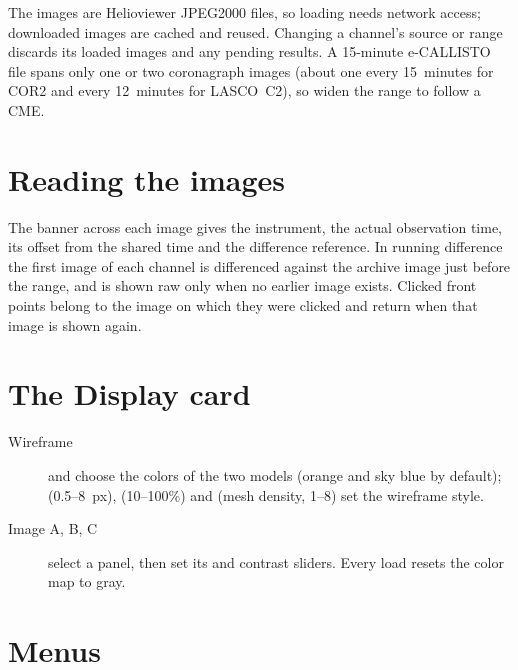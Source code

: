 The images are Helioviewer JPEG2000 files, so loading needs network access; downloaded images
are cached and reused. Changing a channel's source or range discards its loaded images and any
pending results. A 15-minute e-CALLISTO file spans only one or two coronagraph images (about
one every 15~minutes for COR2 and every 12~minutes for LASCO~C2), so widen the range to follow a
CME.

\section{Reading the images}

The banner across each image gives the instrument, the actual observation time, its offset
from the shared time and the difference reference. In running difference the first image of
each channel is differenced against the archive image just before the range, and is shown raw
only when no earlier image exists. Clicked front points belong to the image on which they were
clicked and return when that image is shown again.

\section{The Display card}
\label{sec:gcs-display-card}

\begin{description}
  \item[Wireframe]  and  choose the colors of the two models (orange
    and sky blue by default);  (0.5--8~px),  (10--100\%) and
     (mesh density, 1--8) set the wireframe style.
  \item[Image A, B, C] select a panel, then set its  and contrast sliders. Every
    load resets the color map to gray.
\end{description}

\section{Menus}
\label{sec:gcs-menus}

